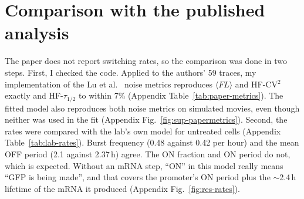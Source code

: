 \section{Comparison with the published analysis}\label{sec:res-paper}

The paper does not report switching rates, so the comparison was done in two steps. First, I checked the code. Applied to the authors' 59 traces, my implementation of the Lu et al.\ \cite{lu2021} noise metrics reproduces $\langle FL\rangle$ and HF-CV$^2$ exactly and HF-$\tau_{1/2}$ to within 7\% (Appendix Table~\ref{tab:paper-metrics}). The fitted model also reproduces both noise metrics on simulated movies, even though neither was used in the fit (Appendix Fig.~\ref{fig:sup-papermetrics}). Second, the rates were compared with the lab's own model for untreated cells \cite{dar2012} (Appendix Table~\ref{tab:lab-rates}). Burst frequency (0.48 against 0.42 per hour) and the mean OFF period (2.1 against 2.37\,h) agree. The ON fraction and ON period do not, which is expected. Without an mRNA step, ``ON'' in this model really means ``GFP is being made'', and that covers the promoter's ON period plus the $\sim$2.4\,h lifetime of the mRNA it produced (Appendix Fig.~\ref{fig:res-rates}).
